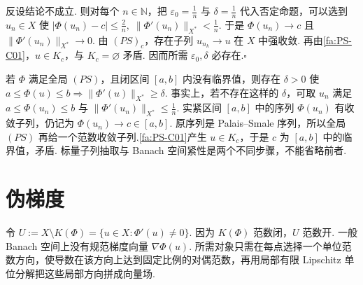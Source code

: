 \begin{FAProof}
反设结论不成立. 则对每个 \(\displaystyle n\in\mathbb N\)，把 \(\displaystyle\varepsilon_0=\frac{1}{n}\) 与 \(\displaystyle\delta=\frac{1}{n}\) 代入否定命题，可以选到 \(\displaystyle u_n\in X\) 使
\(\displaystyle |\Phi(u_n)-c|\leqslant\frac{2}{n}, \; \|\Phi'(u_n)\|_{X^*}<\frac{1}{n}\).
于是 \(\displaystyle\Phi(u_n)\to c\) 且 \(\displaystyle\|\Phi'(u_n)\|_{X^*}\to0\). 由 \(\displaystyle(PS)_c\)，存在子列 \(\displaystyle u_{n_k}\to u\) 在 \(\displaystyle X\) 中强收敛. 再由\autoref{fa:PS-C01}，\(\displaystyle u\in K_c\)，与 \(\displaystyle K_c=\varnothing\) 矛盾. 因而所需 \(\displaystyle\varepsilon_0,\delta\) 必存在.\hfill\(\square\)
\end{FAProof}

\begin{FARemark}[全局紧能量带]
若 \(\displaystyle\Phi\) 满足全局 \(\displaystyle(PS)\)，且闭区间 \(\displaystyle[a,b]\) 内没有临界值，则存在 \(\displaystyle\delta>0\) 使
\(\displaystyle a\leqslant\Phi(u)\leqslant b \Longrightarrow \|\Phi'(u)\|_{X^*}\geqslant\delta\).
事实上，若不存在这样的 \(\displaystyle\delta\)，可取 \(\displaystyle u_n\) 满足 \(\displaystyle a\leqslant\Phi(u_n)\leqslant b\) 与 \(\displaystyle\|\Phi'(u_n)\|_{X^*}\leqslant\frac{1}{n}\). 实紧区间 \(\displaystyle[a,b]\) 中的序列 \(\displaystyle\Phi(u_n)\) 有收敛子列，仍记为 \(\displaystyle\Phi(u_n)\to c\in[a,b]\). 原序列是 Palais--Smale 序列，所以全局 \(\displaystyle(PS)\) 再给一个范数收敛子列.\autoref{fa:PS-C01}产生 \(\displaystyle u\in K_c\)，于是 \(\displaystyle c\) 为 \(\displaystyle[a,b]\) 中的临界值，矛盾. 标量子列抽取与 Banach 空间紧性是两个不同步骤，不能省略前者.
\end{FARemark}

\section{伪梯度}\label{sec:iii09-pseudogradient}

令
\(\displaystyle U:=X\setminus K(\Phi)=\{u\in X:\Phi'(u)\neq0\}\).
因为 \(\displaystyle K(\Phi)\) 范数闭，\(\displaystyle U\) 范数开. 一般 Banach 空间上没有规范梯度向量 \(\displaystyle\nabla\Phi(u)\). 所需对象只需在每点选择一个单位范数方向，使导数在该方向上达到固定比例的对偶范数，再用局部有限 Lipschitz 单位分解把这些局部方向拼成向量场.

